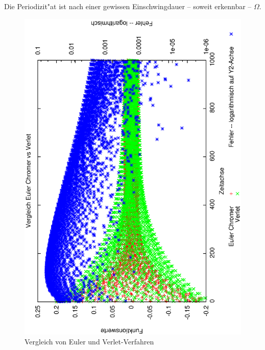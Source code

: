 \documentclass[a4paper,12pt]{article}
\begin{document}
Die Periodizit"at ist nach einer gewissen Einschwingdauer -- soweit
erkennbar -- $\Omega$.


\begin{figure}
  \centering
  \includegraphics[width=\textwidth]{vgl-euler-1}
  \caption{Vergleich von Euler und Verlet-Verfahren}
  \label{fig:euler-verlet}
\end{figure}
\end{document}
